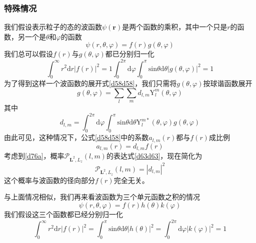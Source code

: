 \documentclass[]{article}
\begin{document}
\subsubsection{特殊情况}
我们假设表示粒子的态的波函数$\psi(\boldsymbol{r})$是两个函数的乘积，其中一个只是$r$的函数，另一个是$\theta$和$\varphi$的函数
\begin{equation}
	\psi(r,\theta,\varphi)=f(r)g(\theta,\varphi)
	\label{d75d75}
\end{equation}
我们总可以假设$f(r)$与$g(\theta,\varphi)$都已分别归一化
\begin{subequations}
	\begin{equation}
		\int_{0}^{\infty}r^2\mathrm{d}r|f(r)|^2=1
		\label{d76a}
	\end{equation}
	\begin{equation}
		\int_{0}^{2\pi}\mathrm{d}\varphi\int_{0}^{\pi}\mathrm{sin}\theta\mathrm{d}\theta|g(\theta,\varphi)|^2=1
	\end{equation}
\end{subequations}
为了得到这样一个波函数的展开式\eqref{d58d58}，我们只需将$g(\theta,\varphi)$按球谐函数展开
\begin{equation}
	g(\theta,\varphi)=\sum\limits_{l}\sum\limits_{m}d_{l,m}\mathrm{Y}_l^m(\theta,\varphi)
\end{equation}
其中
\begin{equation}
	d_{l,m}=\int_{0}^{2\pi}\mathrm{d}\varphi\int_{0}^{\pi}\mathrm{sin}\theta\mathrm{d}\theta\mathrm{Y}_l^{m*}(\theta,\varphi)g(\theta,\varphi)
\end{equation}
由此可见，这种情况下，公式\eqref{d58d58}中的系数$a_{l,m}(r)$都与$f(r)$成比例
\begin{equation}
	a_{l,m}(r)=d_{l,m}f(r)
\end{equation}
考虑到\eqref{d76a}，概率$\mathscr{P}_{\boldsymbol{L}^2,L_z}(l,m)$的表达式\eqref{d63d63}，现在简化为
\begin{equation}
	\mathscr{P}_{\boldsymbol{L}^2,L_z}(l,m)=|d_{l,m}|^2
\end{equation}
这个概率与波函数的径向部分$f(r)$完全无关。\par 
与上面情况相似，我们再来看波函数为三个单元函数之积的情况
\begin{equation}
	\psi(r,\theta,\varphi)=f(r)h(\theta)k(\varphi)
	\label{d81d81}
\end{equation}
我们假设这三个函数都已经分别归一化
\begin{equation}
		\int_{0}^{\infty}r^2\mathrm{d}r|f(r)|^2=\int_{0}^{\pi}\mathrm{sin}\theta\mathrm{d}\theta|h(\theta)|^2=\int_{0}^{2\pi}\mathrm{d}\varphi|k(\varphi)|^2=1
		\label{d82d82}
\end{equation}
\end{document}

